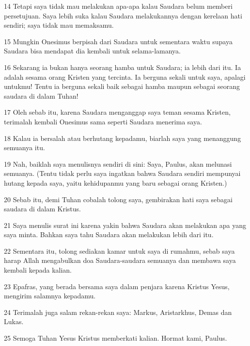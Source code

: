 \par 14 Tetapi saya tidak mau melakukan apa-apa kalau Saudara belum memberi persetujuan. Saya lebih suka kalau Saudara melakukannya dengan kerelaan hati sendiri; saya tidak mau memaksamu.
\par 15 Mungkin Onesimus berpisah dari Saudara untuk sementara waktu supaya Saudara bisa mendapat dia kembali untuk selama-lamanya.
\par 16 Sekarang ia bukan hanya seorang hamba untuk Saudara; ia lebih dari itu. Ia adalah sesama orang Kristen yang tercinta. Ia berguna sekali untuk saya, apalagi untukmu! Tentu ia berguna sekali baik sebagai hamba maupun sebagai seorang saudara di dalam Tuhan!
\par 17 Oleh sebab itu, karena Saudara menganggap saya teman sesama Kristen, terimalah kembali Onesimus sama seperti Saudara menerima saya.
\par 18 Kalau ia bersalah atau berhutang kepadamu, biarlah saya yang menanggung semuanya itu.
\par 19 Nah, baiklah saya menulisnya sendiri di sini: Saya, Paulus, akan melunasi semuanya. (Tentu tidak perlu saya ingatkan bahwa Saudara sendiri mempunyai hutang kepada saya, yaitu kehidupanmu yang baru sebagai orang Kristen.)
\par 20 Sebab itu, demi Tuhan cobalah tolong saya, gembirakan hati saya sebagai saudara di dalam Kristus.
\par 21 Saya menulis surat ini karena yakin bahwa Saudara akan melakukan apa yang saya minta. Bahkan saya tahu Saudara akan melakukan lebih dari itu.
\par 22 Sementara itu, tolong sediakan kamar untuk saya di rumahmu, sebab saya harap Allah mengabulkan doa Saudara-saudara semuanya dan membawa saya kembali kepada kalian.
\par 23 Epafras, yang berada bersama saya dalam penjara karena Kristus Yesus, mengirim salamnya kepadamu.
\par 24 Terimalah juga salam rekan-rekan saya: Markus, Aristarkhus, Demas dan Lukas.
\par 25 Semoga Tuhan Yesus Kristus memberkati kalian. Hormat kami, Paulus.


